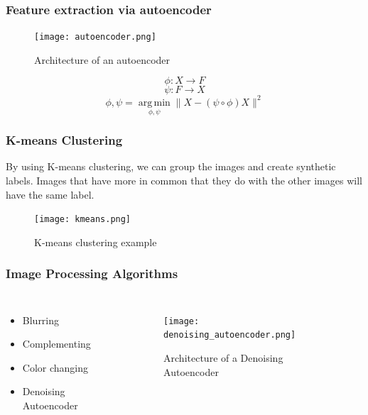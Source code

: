 \documentclass{beamer}
\begin{document}
\begin{frame}
\frametitle{Feature extraction via autoencoder}
\begin{figure}[ht]
    \centering
    \texttt{[image: autoencoder.png]}
    \caption{Architecture of an autoencoder}
    \label{fig:ae}
\end{figure}
\begin{equation}
    \phi:X \rightarrow F
\end{equation}
\begin{equation}
    \psi:F \rightarrow X
\end{equation}
\begin{equation}
\phi,\psi = \operatorname*{arg\,min}_{\phi,\psi} {\parallel}X - (\psi\circ\phi)X{\parallel}^2
\end{equation}
\end{frame}

\begin{frame}
\frametitle{K-means Clustering}
By using K-means clustering, we can group the images and create synthetic labels. Images that have more in common that they do with the other images will have the same label.
\begin{figure}[ht]
    \centering
    \texttt{[image: kmeans.png]}
    \caption{K-means clustering example}
    \label{fig:kmeans}
\end{figure}
\end{frame}

\begin{frame}
\frametitle{Image Processing Algorithms}
\begin{columns}
\begin{itemize}
\item Blurring
\item Complementing
\item Color changing
\item Denoising Autoencoder
\end{itemize}
\begin{figure}[ht]
    \texttt{[image: denoising\_autoencoder.png]}
    \caption{Architecture of a Denoising Autoencoder}
    \label{fig:denoising_autoencoder}
\end{figure}
\end{columns}
\end{frame}
\end{document}
